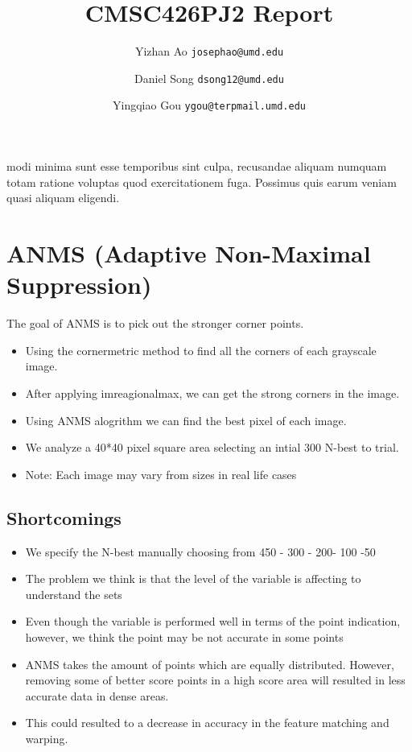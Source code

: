 \documentclass{CUP-JNL-PPS}
\begin{document}
\begin{Frontmatter}

\title[Panorama Report]{CMSC426PJ2 Report}

\author{Yizhan Ao \texttt{josephao@umd.edu}}
\author{Daniel Song \texttt{dsong12@umd.edu}}
\author{Yingqiao Gou \texttt{ygou@terpmail.umd.edu}}



\end{Frontmatter}


modi minima sunt esse temporibus sint culpa, recusandae aliquam numquam
totam ratione voluptas quod exercitationem fuga. Possimus quis earum veniam
quasi aliquam eligendi.

\section[]{ANMS (Adaptive Non-Maximal Suppression)}

The goal of ANMS is to pick out the stronger corner points.
\begin{itemize}
    \item Using the cornermetric method to find all the corners of each grayscale image. 
    \item After applying imreagionalmax, we can get the strong corners in the image.
    \item Using ANMS alogrithm we can find the best pixel of each image.
    \item We analyze a 40*40 pixel square area selecting an intial 300 N-best to trial.
    \item Note: Each image may vary from sizes in real life cases 
\end{itemize}
\subsection{Shortcomings}
\begin{itemize}
    \item We specify the N-best manually choosing from 450 - 300 - 200- 100 -50
    \item The problem we think is that the level of the variable is affecting to understand the sets
    \item Even though the variable is performed well in terms of the point indication, however, we think the point may be not accurate in some points
    \item ANMS takes the amount of points which are equally distributed. However, removing some of better score points in a high score area will resulted in less accurate data in dense areas. 
    \item This could resulted to a decrease in accuracy in the feature matching and warping.
\end{itemize}
\end{document}
